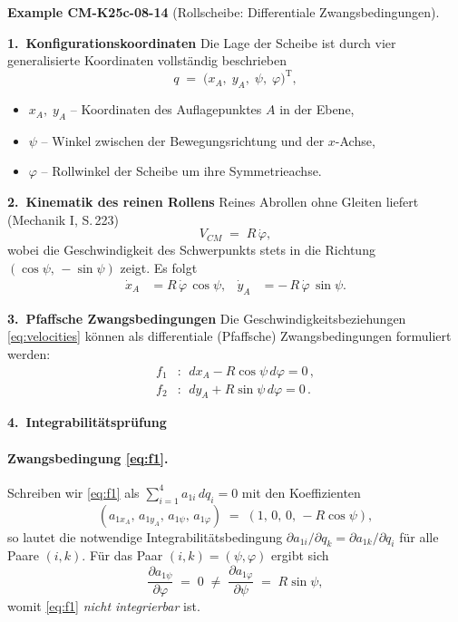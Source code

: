 \documentclass[10pt, letterpaper]{article}
\newcommand{\CustomHeading}[3]{%
  \par\medskip\noindent%
  \textbf{#1 #2} \textnormal{(#3)}.\enskip%
}
\newenvironment{EXA}[2]{\begin{unitbox}\CustomHeading{Example}{#1}{#2}}{\end{unitbox}}
\begin{document}
\begin{EXA}{CM-K25c-08-14}{Rollscheibe: Differentiale Zwangsbedingungen}
\textbf{1.\ Konfigurationskoordinaten}
Die Lage der Scheibe ist durch vier generalisierte Koordinaten vollständig
beschrieben
\[
  q \;=\; \bigl(x_A,\;y_A,\;\psi,\;\varphi\bigr)^{\mathrm T},
\]
\begin{itemize}
  \item $x_A,\;y_A$ – Koordinaten des Auflagepunktes $A$ in der Ebene,
  \item $\psi$ – Winkel zwischen der Bewegungsrichtung und der $x$-Achse,
  \item $\varphi$ – Rollwinkel der Scheibe um ihre Symmetrieachse.
\end{itemize}

\textbf{2.\ Kinematik des reinen Rollens}
Reines Abrollen ohne Gleiten liefert (Mechanik I, S.\,223)
\[
  V_{CM} \;=\; R\,\dot{\varphi},
\]
wobei die Geschwindigkeit des Schwerpunkts stets in die
Richtung $(\cos\psi,\,-\sin\psi)$ zeigt. Es folgt
\begin{align}
  \dot{x}_A &= R\,\dot{\varphi}\,\cos\psi,
  &
  \dot{y}_A &= -\,R\,\dot{\varphi}\,\sin\psi.
  \label{eq:velocities}
\end{align}

\textbf{3.\ Pfaffsche Zwangsbedingungen}
Die Geschwindigkeitsbeziehungen \eqref{eq:velocities} können als
differentiale (Pfaffsche) Zwangsbedingungen formuliert werden:
\begin{align}
  f_1 &:\; \boxed{\,dx_A - R\cos\psi\,d\varphi = 0\,},
  \label{eq:f1}\\[2mm]
  f_2 &:\; \boxed{\,dy_A + R\sin\psi\,d\varphi = 0\,}.
  \label{eq:f2}
\end{align}

\textbf{4.\ Integrabilitätsprüfung}

\paragraph{Zwangsbedingung \eqref{eq:f1}.}
Schreiben wir \eqref{eq:f1} als
\(
  \sum_{i=1}^{4} a_{1i}\,dq_i = 0
\)
mit den Koeffizienten
\[
  (a_{1x_A},\,a_{1y_A},\,a_{1\psi},\,a_{1\varphi})
  \;=\;
  (1,\,0,\,0,\,-R\cos\psi),
\]
so lautet die notwendige Integrabilitätsbedingung
\(
  \partial a_{1i}/\partial q_k
  =
  \partial a_{1k}/\partial q_i
\)
für alle Paare $(i,k)$.  
Für das Paar $(i,k)=(\psi,\varphi)$ ergibt sich
\[
  \frac{\partial a_{1\psi}}{\partial\varphi}
  \;=\; 0
  \;\neq\;
  \frac{\partial a_{1\varphi}}{\partial\psi}
  \;=\;
  R\sin\psi,
\]
womit \eqref{eq:f1} \emph{nicht integrierbar} ist.


\end{EXA}
\end{document}
